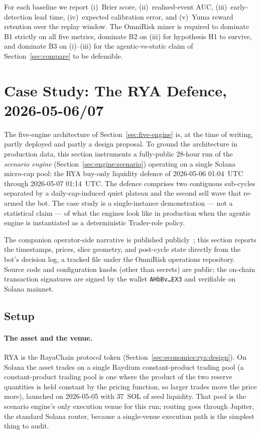 \documentclass[11pt,a4paper]{article}
\begin{document}
For each baseline we report (i)~Brier score, (ii)~realised-event AUC, (iii)~early-detection
lead time, (iv)~expected calibration error, and (v)~Yuma reward retention over the
replay window. The OmniRisk miner is required to dominate B1 strictly on all five
metrics, dominate B2 on (iii) for hypothesis H1 to survive, and dominate B3 on (i)--(iii)
for the agentic-vs-static claim of Section~\ref{sec:compare} to be defensible.

\section{Case Study: The RYA Defence, 2026-05-06/07}\label{sec:case-study}

The five-engine architecture of Section~\ref{sec:five-engine} is, at the time of
writing, partly deployed and partly a design proposal. To ground the architecture in
production data, this section instruments a fully-public 28-hour run of the
\emph{scenario engine} (Section~\ref{sec:engine:scenario}) operating on a single
Solana micro-cap pool: the \textsc{RYA} buy-only liquidity defence of 2026-05-06
01:04~UTC through 2026-05-07 01:14~UTC. The defence comprises two contiguous
sub-cycles separated by a daily-cap-induced quiet plateau and the second sell wave
that re-armed the bot. The case study is a single-instance demonstration --- not
a statistical claim --- of what the engines look like in production when the
agentic engine is instantiated as a deterministic Trader-role policy.

The companion operator-side narrative is published
publicly~\cite{omnirisk2026defending}; this section reports the timestamps,
prices, slice geometry, and post-cycle state directly from the bot's decision log,
a tracked file under the OmniRisk operations repository. Source code and
configuration knobs (other than secrets) are public; the on-chain transaction
signatures are signed by the wallet \texttt{AHbBv\dots EX3} and verifiable on
Solana mainnet.

\subsection{Setup}\label{sec:case-study:setup}

\paragraph{The asset and the venue.} \textsc{RYA} is the RayaChain protocol token
(Section~\ref{sec:economics:rya:design}). On Solana the asset trades on a single
Raydium constant-product trading pool (a constant-product trading pool is one
where the product of the two reserve quantities is held constant by the pricing
function, so larger trades move the price more), launched on 2026-05-05 with
37~SOL of seed liquidity. That pool is the scenario engine's only execution
venue for this run; routing goes through Jupiter, the standard Solana router,
because a single-venue execution path is the simplest thing to audit.
\end{document}
